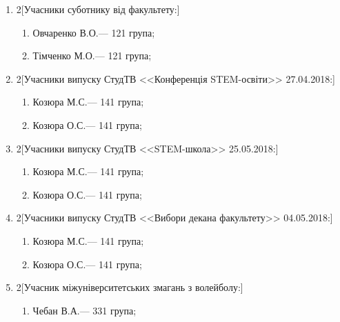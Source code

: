 \documentclass[
	a4paper,
	12pt,
	oneside,
	draft
]{extreport}
\begin{document}
\begin{enumerate}[topsep=0pt,itemsep=-1ex,partopsep=0ex,parsep=1ex]
\item 
\begin{multicols}{2}[Учасники суботнику від факультету:] 
\begin{enumerate}[topsep=0pt,itemsep=-1ex,partopsep=0ex,parsep=1ex,label=\arabic*.]
\item Овчаренко В.О.\hfill --- 121 група;
\item Тімченко М.О.\hfill --- 121 група;
\end{enumerate}
\end{multicols}

\item 
\begin{multicols}{2}[Учасники випуску СтудТВ <<Конференція STEM-освіти>> 27.04.2018:] 
\begin{enumerate}[topsep=0pt,itemsep=-1ex,partopsep=0ex,parsep=1ex,label=\arabic*.]
\item Козюра М.С.\hfill --- 141 група;
\item Козюра О.С.\hfill --- 141 група;
\end{enumerate}
\end{multicols}

\item 
\begin{multicols}{2}[Учасники випуску СтудТВ <<STEM-школа>> 25.05.2018:] 
\begin{enumerate}[topsep=0pt,itemsep=-1ex,partopsep=0ex,parsep=1ex,label=\arabic*.]
\item Козюра М.С.\hfill --- 141 група;
\item Козюра О.С.\hfill --- 141 група;
\end{enumerate}
\end{multicols}

\item 
\begin{multicols}{2}[Учасники випуску СтудТВ <<Вибори декана факультету>> 04.05.2018:] 
\begin{enumerate}[topsep=0pt,itemsep=-1ex,partopsep=0ex,parsep=1ex,label=\arabic*.]
\item Козюра М.С.\hfill --- 141 група;
\item Козюра О.С.\hfill --- 141 група;
\end{enumerate}
\end{multicols}

\item 
\begin{multicols}{2}[Учасник міжуніверситетських змагань з волейболу:] 
\begin{enumerate}[topsep=0pt,itemsep=-1ex,partopsep=0ex,parsep=1ex,label=\arabic*.]
\item Чебан В.А.\hfill --- 331 група;
\end{enumerate}
\end{multicols}


\end{enumerate}
\end{document}
